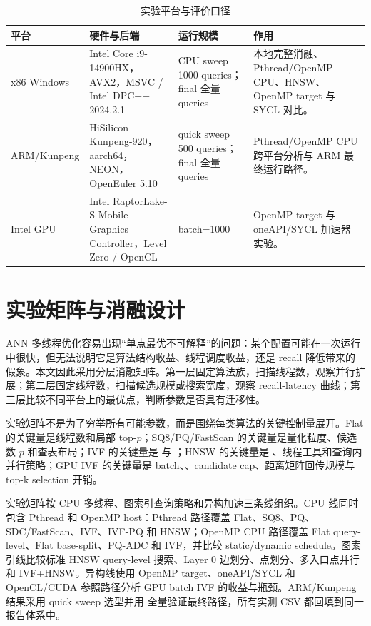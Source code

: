 \documentclass[11pt,a4paper]{article}
\newcommand{\code}[1]{\texttt{\detokenize{#1}}}
\begin{document}
\begin{table}[H]\centering\scriptsize
\caption{实验平台与评价口径}
\label{tab:platform_setup}
\begin{tabularx}{\textwidth}{>{\raggedright\arraybackslash}p{}>{\raggedright\arraybackslash}p{}>{\raggedright\arraybackslash}p{}>{\raggedright\arraybackslash}X}
\toprule
平台 & 硬件与后端 & 运行规模 & 作用 \\
\midrule
x86 Windows & Intel Core i9-14900HX，AVX2，MSVC / Intel DPC++ 2024.2.1 & CPU sweep 1000 queries；final 全量 queries & 本地完整消融、Pthread/OpenMP CPU、HNSW、OpenMP target 与 SYCL 对比。 \\
ARM/Kunpeng & HiSilicon Kunpeng-920，aarch64，NEON，OpenEuler 5.10 & quick sweep 500 queries；final 全量 queries & Pthread/OpenMP CPU 跨平台分析与 ARM 最终运行路径。 \\
Intel GPU & Intel RaptorLake-S Mobile Graphics Controller，Level Zero / OpenCL & batch=1000 & OpenMP target 与 oneAPI/SYCL 加速器实验。 \\
\bottomrule
\end{tabularx}
\end{table}

\section{实验矩阵与消融设计}
\label{sec:ablation_design}

ANN 多线程优化容易出现“单点最优不可解释”的问题：某个配置可能在一次运行中很快，但无法说明它是算法结构收益、线程调度收益，还是 recall 降低带来的假象。本文因此采用分层消融矩阵。第一层固定算法族，扫描线程数，观察并行扩展；第二层固定线程数，扫描候选规模或搜索宽度，观察 recall-latency 曲线；第三层比较不同平台上的最优点，判断参数是否具有迁移性。

实验矩阵不是为了穷举所有可能参数，而是围绕每类算法的关键控制量展开。Flat 的关键量是线程数和局部 top-$p$；SQ8/PQ/FastScan 的关键量是量化粒度、候选数 $p$ 和查表布局；IVF 的关键量是 \code{nlist} 与 \code{nprobe}；HNSW 的关键量是 \code{ef}、线程工具和查询内并行策略；GPU IVF 的关键量是 batch、\code{nprobe}、candidate cap、距离矩阵回传规模与 top-k selection 开销。

实验矩阵按 CPU 多线程、图索引查询策略和异构加速三条线组织。CPU 线同时包含 Pthread 和 OpenMP host：Pthread 路径覆盖 Flat、SQ8、PQ、SDC/FastScan、IVF、IVF-PQ 和 HNSW；OpenMP CPU 路径覆盖 Flat query-level、Flat base-split、PQ-ADC 和 IVF，并比较 static/dynamic schedule。图索引线比较标准 HNSW query-level 搜索、Layer 0 边划分、点划分、多入口点并行和 IVF+HNSW。异构线使用 OpenMP target、oneAPI/SYCL 和 OpenCL/CUDA 参照路径分析 GPU batch IVF 的收益与瓶颈。ARM/Kunpeng 结果采用 quick sweep 选型并用 \code{test.sh} 全量验证最终路径，所有实测 CSV 都回填到同一报告体系中。
\end{document}
